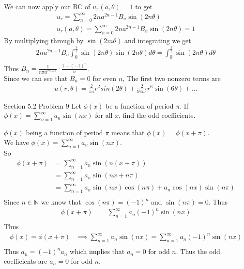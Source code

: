 \documentclass[answers,12pt,addpoints]{exam}
\begin{document}
\begin{questions}
\begin{solution}
\begin{align*}
        \end{align*}
        We can now apply our BC of $u_r(a, \theta) = 1$ to get
        \begin{align*}
            u_r = \sum_{n=0}^\infty 2n a^{2n-1} B_n \sin(2n\theta)\\
            u_r(a, \theta) = \sum_{n=0}^\infty 2n a^{2n-1} B_n \sin(2n\theta) = 1
        \end{align*}
        By multiplying through by $\sin(2m\theta)$ and integrating we get
        \begin{align*}
            2n a^{2n-1} B_n \int_{0}^{\frac{\pi}{2}} \sin(2n\theta) \sin(2n\theta) d\theta = \int_{0}^{\frac{\pi}{2}} \sin(2n\theta) d\theta\\
        \end{align*}
        Thus $B_n = \frac{1}{n \pi a^{2n-1}} \cdot \frac{1-(-1)^n}{n}$. \\

        Since we can see that $B_n = 0$ for even $n$, The first two nonzero terms are
        \begin{align*}
            u(r, \theta) = \frac{2}{\pi a} r^2 sin(2\theta) + \frac{2}{9 \pi a^5} r^6 \sin(6\theta) + \ldots
        \end{align*}
    \end{solution}

    \question Section 5.2 Problem 9
    Let \(\phi(x)\) be a function of period \(\pi\). If \(\phi(x) = \sum_{n=1}^{\infty} a_n \sin(nx)\) for all \(x\), find the odd coefficients.
    \begin{solution}
        $\phi(x)$ being a function of period $\pi$ means that $\phi(x) = \phi(x + \pi)$. \\
        We have $\phi(x) = \sum_{n=1}^{\infty} a_n \sin(nx)$. \\
        So 
        \begin{align*}
            \phi(x + \pi) &= \sum_{n=1}^{\infty} a_n \sin(n(x + \pi)) \\
            &= \sum_{n=1}^{\infty} a_n \sin(nx + n\pi) \\
            &= \sum_{n=1}^{\infty} a_n \sin(nx) \cos(n\pi) + a_n \cos(nx) \sin(n\pi) \\
        \end{align*}
        Since $n \in \mathbb{N}$ we know that $\cos(n\pi) = (-1)^n$ and $\sin(n\pi) = 0$. Thus
        \begin{align*}
            \phi(x + \pi) &= \sum_{n=1}^{\infty} a_n (-1)^n \sin(nx)\\
        \end{align*}
        Thus 
        \begin{align*}
            \phi(x) = \phi(x + \pi) &\implies \sum_{n=1}^{\infty} a_n \sin(nx) = \sum_{n=1}^{\infty} a_n (-1)^n \sin(nx)\\
        \end{align*}
        Thus $a_n = (-1)^n a_n$ which implies that $a_n = 0$ for odd $n$. Thus the odd coefficients are $a_n = 0$ for odd $n$.
    \end{solution}


\end{questions}
\end{document}
